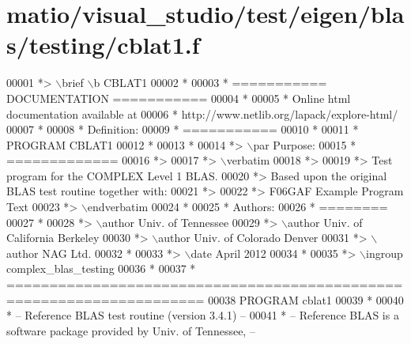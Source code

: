 \hypertarget{matio_2visual__studio_2test_2eigen_2blas_2testing_2cblat1_8f_source}{}\section{matio/visual\+\_\+studio/test/eigen/blas/testing/cblat1.f}
\label{matio_2visual__studio_2test_2eigen_2blas_2testing_2cblat1_8f_source}

\begin{DoxyCode}
00001 \textcolor{comment}{*> \(\backslash\)brief \(\backslash\)b CBLAT1}
00002 \textcolor{comment}{*}
00003 \textcolor{comment}{*  =========== DOCUMENTATION ===========}
00004 \textcolor{comment}{*}
00005 \textcolor{comment}{* Online html documentation available at }
00006 \textcolor{comment}{*            http://www.netlib.org/lapack/explore-html/ }
00007 \textcolor{comment}{*}
00008 \textcolor{comment}{*  Definition:}
00009 \textcolor{comment}{*  ===========}
00010 \textcolor{comment}{*}
00011 \textcolor{comment}{*       PROGRAM CBLAT1}
00012 \textcolor{comment}{* }
00013 \textcolor{comment}{*}
00014 \textcolor{comment}{*> \(\backslash\)par Purpose:}
00015 \textcolor{comment}{*  =============}
00016 \textcolor{comment}{*>}
00017 \textcolor{comment}{*> \(\backslash\)verbatim}
00018 \textcolor{comment}{*>}
00019 \textcolor{comment}{*>    Test program for the COMPLEX Level 1 BLAS.}
00020 \textcolor{comment}{*>    Based upon the original BLAS test routine together with:}
00021 \textcolor{comment}{*>}
00022 \textcolor{comment}{*>    F06GAF Example Program Text}
00023 \textcolor{comment}{*> \(\backslash\)endverbatim}
00024 \textcolor{comment}{*}
00025 \textcolor{comment}{*  Authors:}
00026 \textcolor{comment}{*  ========}
00027 \textcolor{comment}{*}
00028 \textcolor{comment}{*> \(\backslash\)author Univ. of Tennessee }
00029 \textcolor{comment}{*> \(\backslash\)author Univ. of California Berkeley }
00030 \textcolor{comment}{*> \(\backslash\)author Univ. of Colorado Denver }
00031 \textcolor{comment}{*> \(\backslash\)author NAG Ltd. }
00032 \textcolor{comment}{*}
00033 \textcolor{comment}{*> \(\backslash\)date April 2012}
00034 \textcolor{comment}{*}
00035 \textcolor{comment}{*> \(\backslash\)ingroup complex\_blas\_testing}
00036 \textcolor{comment}{*}
00037 \textcolor{comment}{*  =====================================================================}
00038       \textcolor{keyword}{PROGRAM} cblat1
00039 \textcolor{comment}{*}
00040 \textcolor{comment}{*  -- Reference BLAS test routine (version 3.4.1) --}
00041 \textcolor{comment}{*  -- Reference BLAS is a software package provided by Univ. of Tennessee,    --}

\end{DoxyCode}
